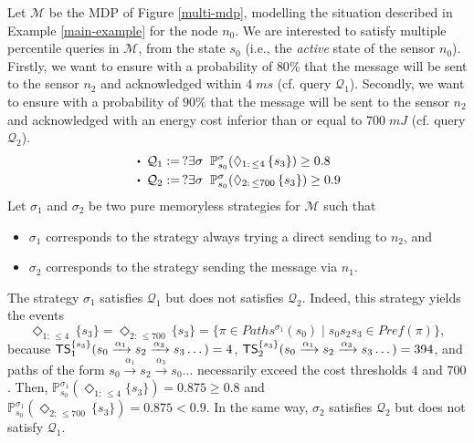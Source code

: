 \begin{example} \label{SSPQ-example1}
  Let $\mathcal{M}$ be the MDP of Figure \ref{multi-mdp}, modelling the situation described in Example \ref{main-example} for the node $n_0$.
  We are interested to satisfy multiple percentile queries in $\mathcal{M}$, from the state $s_0$ (i.e., the \textit{active} state of the sensor $n_0$).
  Firstly, we want to ensure with a probability of $80 \%$ that the message will be sent to the sensor $n_2$ and acknowledged within $4 \; ms$ (cf. query $\mathcal{Q}_1$). Secondly, we want to ensure with a probability of $90 \%$ that the message will be sent to the sensor $n_2$ and acknowledged with an energy cost inferior than or equal to $700 \; mJ$ (cf. query $\mathcal{Q}_2$).
  \begin{align*}
    &\bigcdot\;\mathcal{Q}_1 := \,  ?\exists \sigma \;\; \mathbb{P}^{\sigma}_{s_0}(\Diamond_{1: \, \leq 4} \, \{s_3\}) \geq 0.8 \\
    &\bigcdot\;\mathcal{Q}_2 := \, ? \exists \sigma \;\; \mathbb{P}_{s_0}^{\sigma}(\Diamond_{2: \, \leq 700} \, \{s_3\}) \geq 0.9
  \end{align*}
  Let $\sigma_1$ and $\sigma_2$ be two pure memoryless strategies for $\mathcal{M}$ such that
  \begin{itemize}
    \item $\sigma_1$ corresponds to the strategy always trying a direct sending to $n_2$, and
    \item $\sigma_2$ corresponds to the strategy sending the message via $n_1$.
  \end{itemize}
  The strategy $\sigma_1$ satisfies $\mathcal{Q}_1$ but does not satisfies $\mathcal{Q}_2$.
  Indeed, this strategy yields %
  the events
  \[\Diamond_{1:\, \leq 4}\, \{s_3\} = \Diamond_{2:\, \leq 700}\, \{s_3\} = \{ \pi \in Paths^{\sigma_1}(s_0) \; | \; s_0 %
  s_2 %
  s_3 %
  \in Pref(\pi) \},\]
  because $\text{\sffamily TS}^{\{s_3\}}_1 (s_0 \xrightarrow{\alpha_1}s_2 \xrightarrow{\alpha_3}s_3 \dots) = 4 $,
  $\text{\sffamily TS}^{\{s_3\}}_2 (s_0 \xrightarrow{\alpha_1}s_2 \xrightarrow{\alpha_3}s_3 \dots) = 394 $, and
  paths of the form $s_0 \xrightarrow{\alpha_1}s_2 \xrightarrow{\alpha_3}s_0 \dots$ necessarily exceed the cost thresholds $4$ and $700$.
  Then, $\mathbb{P}_{s_0}^{\sigma_1}(\Diamond_{1:\, \leq 4}\{s_3\}) = 0.875 \geq 0.8$ and $\mathbb{P}_{s_0}^{\sigma_1}(\Diamond_{2: \, \leq 700} \, \{s_3\}) = 0.875<0.9$.
  In the same way, $\sigma_2$ satisfies $\mathcal{Q}_2$ but does not satisfy $\mathcal{Q}_1$.

\end{example}
